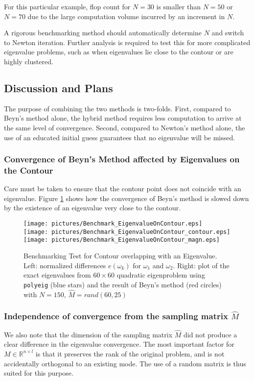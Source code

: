 \documentclass[final,leqno,onefignum,onetabnum]{siamltex1213}
\begin{document}
For this particular example, flop count for $N=30$ is smaller than $N=50$ or $N=70$ due to the large computation volume incurred by an increment in $N$. 




A rigorous benchmarking method should automatically determine $N$ and switch to Newton iteration. Further analysis is required to test this for more complicated eigenvalue problems, such as when eigenvalues lie close to the contour or are highly clustered.
\pagebreak
\subsection{Discussion and Plans}
The purpose of combining the two methods is two-folds. First, compared to Beyn's method alone, the hybrid method requires less computation to arrive at the same level of convergence. Second, compared to Newton's method alone, the use of an educated initial guess guarantees that no eigenvalue will be missed.
\subsubsection{Convergence of Beyn's Method affected by Eigenvalues on the Contour}
Care must be taken to ensure that the contour point does not coincide with an eigenvalue. Figure \ref{fig:overlap} shows how the convergence of Beyn's method is slowed down by the existence of an eigenvalue very close to the contour.
\begin{figure}\label{fig:overlap}
\begin{center}
\texttt{[image: pictures/Benchmark\_EigenvalueOnContour.eps]}\\
\texttt{[image: pictures/Benchmark\_EigenvalueOnContour\_contour.eps]}
\texttt{[image: pictures/Benchmark\_EigenvalueOnContour\_magn.eps]}
\end{center}
\caption{Benchmarking Test for Contour overlapping with an Eigenvalue. \textnormal{Left: normalized differences $e(\omega_k)$ for $\omega_1$ and $\omega_2$. Right: plot of the exact eigenvalues from $60 \times 60$ quadratic eigenproblem using {\tt polyeig} (blue stars) and the result of Beyn's method (red circles) with $N=150$, $\hat{M}=rand(60,25)$}}
\end{figure}

\subsubsection{Independence of convergence from the sampling matrix $\hat{M}$}
We also note that the dimension of the sampling matrix $\hat{M}$ did not produce a clear difference in the eigenvalue convergence. The most important factor for $M\in \mathbb{R}^{n\times l}$ is that it preserves the rank of the original problem, and is not accidentally orthogonal to an existing mode. The use of a random matrix is thus suited for this purpose.
\end{document}
